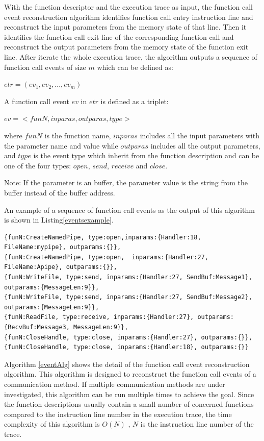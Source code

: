 With the function descriptor and the execution trace as input, the function call event reconstruction algorithm identifies function call entry instruction line and reconstruct the input parameters from the memory state of that line. Then it identifies the function call exit line of the corresponding function call and reconstruct the output parameters from the memory state of the function exit line. After iterate the whole execution trace, the algorithm outputs a sequence of function call events of size $m$ which can be defined as:

$etr = (ev_1, ev_2, ..., ev_m)$

A function call event $ev$ in $etr$ is defined as a triplet:

$ev = <funN, inparas, outparas, type>$

where $funN$ is the function name, $inparas$ includes all the input parameters with the parameter name and value while $outparas$ includes all the output parameters, and $type$ is the event type which inherit from the function description and can be one of the four types: $open$, $send$, $receive$ and $close$.

Note: If the parameter is an buffer, the parameter value is the string from the buffer instead of the buffer address.

An example of a sequence of function call events as the output of this algorithm is shown in Listing\ref{eventsexample}.

\begin{lstlisting}[caption= Example of  $etr$, label=eventsexample]
{funN:CreateNamedPipe, type:open,inparams:{Handler:18, FileName:mypipe}, outparams:{}},
{funN:CreateNamedPipe, type:open,  inparams:{Handler:27,  FileName:Apipe}, outparams:{}},
{funN:WriteFile, type:send, inparams:{Handler:27, SendBuf:Message1}, outparams:{MessageLen:9}},
{funN:WriteFile, type:send, inparams:{Handler:27, SendBuf:Message2}, outparams:{MessageLen:9}},
{funN:ReadFile, type:receive, inparams:{Handler:27}, outparams:{RecvBuf:Message3, MessageLen:9}},
{funN:CloseHandle, type:close, inparams:{Handler:27}, outparams:{}},
{funN:CloseHandle, type:close, inparams:{Handler:18}, outparams:{}}
\end{lstlisting}

Algorithm \ref{eventAlg} shows the detail of the function call event reconstruction algorithm. This algorithm is designed to reconstruct the function call events of a communication method. If multiple communication methods are under investigated, this algorithm can be run multiple times to achieve the goal. Since the function descriptions usually contain a  small number of concerned functions compared to the instruction line number in the execution trace, the time complexity of this algorithm is $O(N)$ , $N$ is the instruction line number of the trace.

